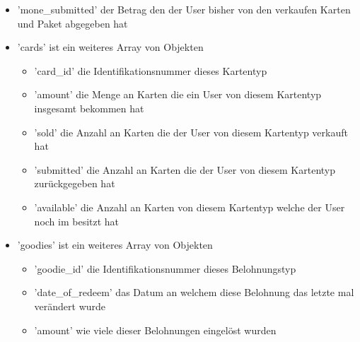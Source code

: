 \begin{itemize}
\begin{itemize}
						\item 'mone\_submitted' der Betrag den der User bisher von den verkaufen Karten und Paket abgegeben hat
						\item 'cards' ist ein weiteres Array von Objekten
						\begin{itemize}
							\item 'card\_id' die Identifikationsnummer dieses Kartentyp
							\item 'amount' die Menge an Karten die ein User von diesem Kartentyp insgesamt bekommen hat
							\item 'sold' die Anzahl an Karten die der User von diesem Kartentyp verkauft hat
							\item 'submitted' die Anzahl an Karten die der User von diesem Kartentyp zurückgegeben hat
							\item 'available' die Anzahl an Karten von diesem Kartentyp welche der User noch im besitzt hat
						\end{itemize}
						\item 'goodies' ist ein weiteres Array von Objekten
						\begin{itemize}
							\item 'goodie\_id' die Identifikationsnummer dieses Belohnungstyp
							\item 'date\_of\_redeem' das Datum an welchem diese Belohnung das letzte mal verändert wurde
							\item 'amount' wie viele dieser Belohnungen eingelöst wurden
						\end{itemize}
					\end{itemize}
				\end{itemize}
			
		\newpage
		
